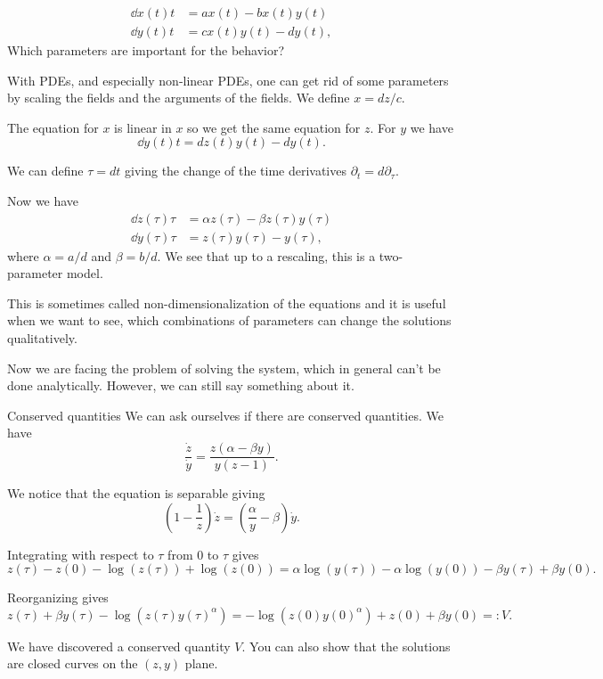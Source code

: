 \begin{frame}
	\[ 
	\begin{split}
		\dd{x(t)}{t} &= a x(t) - b x(t) y(t) \\
		\dd{y(t)}{t} &= c x(t) y(t) - d y(t),
	\end{split}	
	\] 
	Which parameters are important for the behavior? 
	
	\pause
	With PDEs, and especially non-linear PDEs, one can get rid of some parameters by scaling the fields and the arguments of the fields. We define $ x = d z /c  $. 
	
	\pause
	The equation for $ x $ is linear in $ x $ so we get the same equation for $ z $. For $ y $ we have
	\[ \dd{y(t)}{t} = d z(t) y(t) - d y(t). \]
	
	\pause
	We can define $ \tau = d t $ giving the change of the time derivatives $ \partial_t = d \partial_\tau $. 
\end{frame}

\begin{frame}
	Now we have
	\[ 
	\begin{split}
		\dd{z(\tau)}{\tau} &=  \alpha z(\tau) - \beta z(\tau) y(\tau) \\
		\dd{y(\tau)}{\tau} &= z(\tau) y(\tau) - y(\tau),
	\end{split}	
	\] 
	where $ \alpha = a/d $ and $ \beta = b/d $. We see that up to a rescaling, this is a two-parameter model. 
	
	\pause
	This is sometimes called non-dimensionalization of the equations and it is useful when we want to see, which combinations of parameters can change the solutions qualitatively. 
	
	\pause
	Now we are facing the problem of solving the system, which in general can't be done analytically. However, we can still say something about it.
\end{frame}

\begin{frame}{Conserved quantities}
	We can ask ourselves if there are conserved quantities. We have
	\[ \frac{\dot{z}}{\dot{y}} = \frac{z(\alpha  - \beta  y) }{y (z  - 1)}. \]
	
	\pause
	We notice that the equation is separable giving
	\[ \left( 1 - \frac{1}{z} \right) \dot{z} = \left(  \frac{\alpha}{y} - \beta \right) \dot{y}. \]
	
	\pause
	Integrating with respect to $ \tau $ from 0 to $ \tau $ gives
	\[ z(\tau) - z(0) - \log(z(\tau)) + \log(z(0)) = \alpha \log(y(\tau)) - \alpha\log(y(0)) - \beta y(\tau) + \beta y(0). \]
	
	\pause
	Reorganizing gives
	\[ z(\tau) + \beta y(\tau) - \log(z(\tau) y(\tau)^{\alpha}) = -\log(z(0)  y(0)^{\alpha}) + z(0) + \beta y(0) =: V.  \]
	
	\pause
	We have discovered a conserved quantity $ V $. You can also show that the solutions are closed curves on the $ (z,y) $ plane.
\end{frame}

